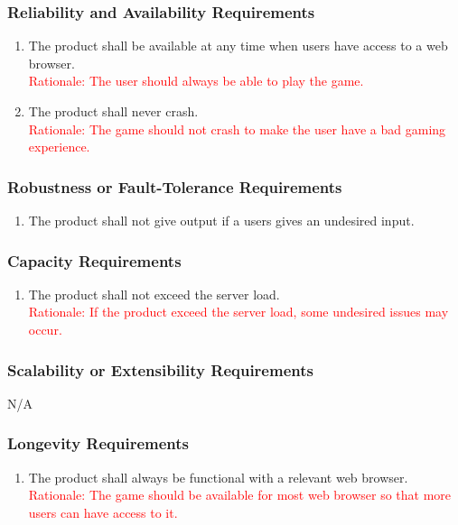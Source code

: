 \documentclass[12pt, titlepage]{article}
\begin{document}
\subsubsection{Reliability and Availability Requirements}
\begin{enumerate}
    \item The product shall be available at any time when users have access to a web browser.\\
    \textcolor{red}{Rationale: The user should always be able to play the game.}
    \item The product shall never crash.\\
    \textcolor{red}{Rationale: The game should not crash to make the user have a bad gaming experience.}
\end{enumerate}

\subsubsection{Robustness or Fault-Tolerance Requirements}
\begin{enumerate}
    \item The product shall not give output if a users gives an undesired input.
\end{enumerate}

\subsubsection{Capacity Requirements}
\begin{enumerate}
    \item The product shall not exceed the server load.\\
    \textcolor{red}{Rationale: If the product exceed the server load, some undesired issues may occur.}
\end{enumerate}

\subsubsection{Scalability or Extensibility Requirements}
N/A

\subsubsection{Longevity Requirements}
\begin{enumerate}
    \item The product shall always be functional with a relevant web browser.\\
    \textcolor{red}{Rationale: The game should be available for most web browser so that more users can have access to it.}
\end{enumerate}
\end{document}
